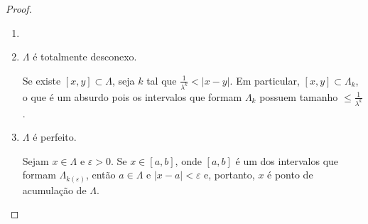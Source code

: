 \begin{proof}
\begin{enumerate}[label=\alph*)]\item[]
\item $\Lambda$ é totalmente desconexo.

Se existe $[x, y] \subset \Lambda$, seja $k$ tal que $\frac{1}{\lambda^k} < |x - y|$.
Em particular, $[x, y] \subset \Lambda_k$, o que é um absurdo pois os intervalos que formam $\Lambda_k$ possuem tamanho $\leq \frac{1}{\lambda^k}$.

\item $\Lambda$ é perfeito.

Sejam $x \in \Lambda$ e $\varepsilon > 0$.
Se $x \in [a, b]$, onde $[a, b]$ é um dos intervalos que formam $\Lambda_{k(\varepsilon)}$, então $a \in \Lambda$ e $|x - a| < \varepsilon$ e, portanto, $x$ é ponto de acumulação de $\Lambda$.
\end{enumerate}
\end{proof}
